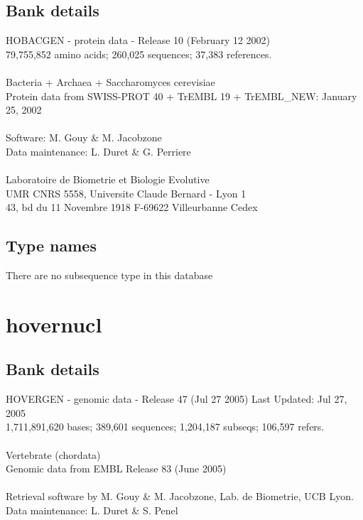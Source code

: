 \documentclass{article}
\begin{document}
\begin{Schunk}
\subsection{Bank details}
HOBACGEN - protein data - Release 10 (February 12 2002)\\
79,755,852 amino acids; 260,025 sequences; 37,383 references.\\
\\
Bacteria + Archaea + Saccharomyces cerevisiae\\
Protein data from SWISS-PROT 40 + TrEMBL 19 + TrEMBL\_NEW: January 25, 2002\\
\\
Software: M. Gouy \& M. Jacobzone\\
Data maintenance: L. Duret \& G. Perriere\\
\\
Laboratoire de Biometrie et Biologie Evolutive\\
UMR CNRS 5558, Universite Claude Bernard - Lyon 1\\
43, bd du 11 Novembre 1918 F-69622 Villeurbanne Cedex\\


\subsection{Type names}
There are no subsequence type in this database
\section{ hovernucl }
\subsection{Bank details}
HOVERGEN - genomic data - Release 47 (Jul 27 2005) Last Updated: Jul 27, 2005\\
1,711,891,620 bases; 389,601 sequences; 1,204,187 subseqs; 106,597 refers.\\
\\
Vertebrate (chordata)\\
Genomic data from EMBL Release 83  (June 2005)\\
\\
Retrieval software by M. Gouy \& M. Jacobzone, Lab. de Biometrie, UCB Lyon.\\
Data maintenance: L. Duret \& S. Penel\\



\end{Schunk}
\end{document}
